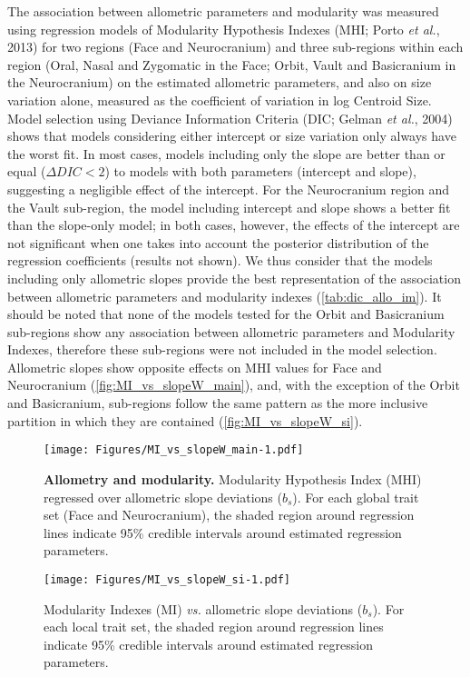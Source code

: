 \documentclass[12pt,twoside]{report}
\begin{document}
The association between allometric parameters and modularity was
measured using regression models of Modularity Hypothesis Indexes (MHI;
Porto \emph{et al.}, 2013) for two regions (Face and Neurocranium) and
three sub-regions within each region (Oral, Nasal and Zygomatic in the
Face; Orbit, Vault and Basicranium in the Neurocranium) on the estimated
allometric parameters, and also on size variation alone, measured as the
coefficient of variation in log Centroid Size. Model selection using
Deviance Information Criteria (DIC; Gelman \emph{et al.}, 2004) shows
that models considering either intercept or size variation only always
have the worst fit. In most cases, models including only the slope are
better than or equal ($\Delta DIC < 2$) to models with both parameters
(intercept and slope), suggesting a negligible effect of the intercept.
For the Neurocranium region and the Vault sub-region, the model
including intercept and slope shows a better fit than the slope-only
model; in both cases, however, the effects of the intercept are not
significant when one takes into account the posterior distribution of
the regression coefficients (results not shown). We thus consider that
the models including only allometric slopes provide the best
representation of the association between allometric parameters and
modularity indexes (\autoref{tab:dic_allo_im}). It should be noted that
none of the models tested for the Orbit and Basicranium sub-regions show
any association between allometric parameters and Modularity Indexes,
therefore these sub-regions were not included in the model selection.
Allometric slopes show opposite effects on MHI values for Face and
Neurocranium (\autoref{fig:MI_vs_slopeW_main}), and, with the exception
of the Orbit and Basicranium, sub-regions follow the same pattern as the
more inclusive partition in which they are contained
(\autoref{fig:MI_vs_slopeW_si}).



\begin{figure}[htbp]
\centering
\texttt{[image: Figures/MI\_vs\_slopeW\_main-1.pdf]}
\caption{\textbf{Allometry and modularity.} Modularity Hypothesis Index
(MHI) regressed over allometric slope deviations ($b_s$). For each
global trait set (Face and Neurocranium), the shaded region around
regression lines indicate 95\% credible intervals around estimated
regression parameters. \label{fig:MI_vs_slopeW_main}}
\end{figure}

\begin{figure}[htbp]
\centering
\texttt{[image: Figures/MI\_vs\_slopeW\_si-1.pdf]}
\caption{Modularity Indexes (MI) \emph{vs.} allometric slope deviations
($b_s$). For each local trait set, the shaded region around regression
lines indicate 95\% credible intervals around estimated regression
parameters. \label{fig:MI_vs_slopeW_si}}
\end{figure}
\end{document}
